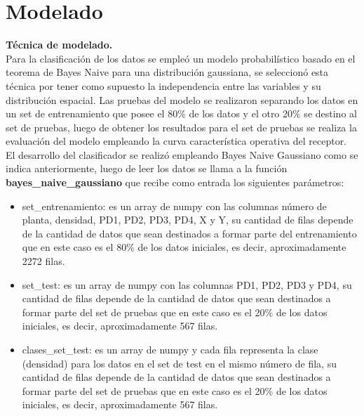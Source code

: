\section{Modelado}

\noindent
\textbf{Técnica de modelado.}\\

Para la clasificación de los datos se empleó un modelo probabilístico basado en el teorema de Bayes Naive para una distribución
gaussiana, se seleccionó esta técnica por tener como supuesto la independencia entre las variables y su distribución
espacial. Las pruebas del modelo se realizaron separando los datos en un set de entrenamiento que posee el 80\% de los
datos y el otro 20\% se destino al set de pruebas, luego de obtener los resultados para el set de pruebas se realiza la
evaluación del modelo empleando la curva característica operativa del receptor.\\

El desarrollo del clasificador se realizó empleando Bayes Naive Gaussiano como se indica anteriormente, luego de leer los datos se llama a la función
\textbf{bayes\_naive\_gaussiano} que recibe como entrada los siguientes parámetros:
\begin{itemize}
	\item{set\_entrenamiento: es un array de numpy con las columnas número de planta, densidad, PD1, PD2, PD3, PD4, X y Y, su
	cantidad de filas depende de la cantidad de datos que sean destinados a formar parte del entrenamiento que en este caso es
	el 80\% de los datos iniciales, es decir, aproximadamente 2272 filas.}
	\item{set\_test: es un array de numpy con las columnas PD1, PD2, PD3 y PD4, su cantidad de filas depende de la cantidad de
	datos que sean destinados a formar parte del set de pruebas que en este caso es el 20\% de los datos iniciales, es decir,
	aproximadamente 567 filas.}
	\item{clases\_set\_test: es un array de numpy y cada fila representa la clase (densidad) para los datos en el set de test
	en el mismo número de fila, su cantidad de filas depende de la cantidad de datos que sean destinados a formar parte del set
	de pruebas que en este caso es el 20\% de los datos iniciales, es decir, aproximadamente 567 filas.\\}
\end{itemize}

